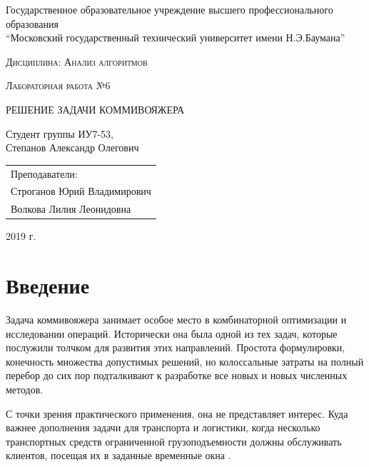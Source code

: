 \documentclass[a4paper,12pt]{article}
\newcommand{\anonsection}[1]{\section*{#1}\addcontentsline{toc}{section}{#1}}
\begin{document}
\begin{titlepage}

    \begin{center}
        \large
        Государственное образовательное учреждение высшего профессионального образования\\
        “Московский государственный технический университет имени Н.Э.Баумана”
        \vspace{3cm}

        \textsc{Дисциплина: Анализ алгоритмов}
        \vspace{0.5cm}

        \textsc{Лабораторная работа №6}
        \vspace{3cm}

        {\LARGE РЕШЕНИЕ ЗАДАЧИ КОММИВОЯЖЕРА}
        \vspace{3cm}

        Студент группы ИУ7-53,\\
        Степанов Александр Олегович
        \vfill
    \end{center}

    \begin{flushright}
        \begin{tabular}{l}
            Преподаватели:\\
            Строганов Юрий Владимирович\\
            Волкова Лилия Леонидовна
        \end{tabular}
    \end{flushright}

    \begin{center}

        2019 г.

    \end{center}

\end{titlepage}

\tableofcontents

\newpage
\anonsection{Введение}

Задача коммивояжера занимает особое место в комбинаторной оптимизации и исследовании операций.
Исторически она была одной из тех задач, которые послужили толчком для развития этих направлений.
Простота формулировки, конечность множества допустимых решений, но колоссальные затраты на полный
перебор до сих пор подталкивают к разработке все новых и новых численных методов.

С точки зрения практического применения, она не представляет интерес.
Куда важнее дополнения задачи для транспорта и логистики, когда несколько
транспортных средств ограниченной грузоподъемности должны обслуживать клиентов,
посещая их в заданные временные окна \cite{kommivoyadjer}.
\end{document}
